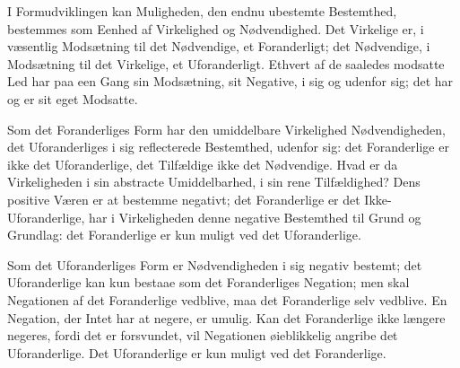 \documentclass[12pt]{book}
\begin{document}
I Formudviklingen kan Muligheden, den endnu ubestemte
Bestemthed, bestemmes som Eenhed af Virkelighed og Nødvendighed.
Det Virkelige er, i væsentlig Modsætning til det
Nødvendige, et Foranderligt; det Nødvendige, i Modsætning
til det Virkelige, et Uforanderligt. Ethvert af de saaledes
modsatte Led har paa een Gang sin Modsætning, sit Negative,
i sig og udenfor sig; det har og er sit eget Modsatte.

Som det Foranderliges Form har den umiddelbare Virkelighed
Nødvendigheden, det Uforanderliges i sig reflecterede
Bestemthed, udenfor sig: det Foranderlige er ikke det Uforanderlige,
det Tilfældige ikke det Nødvendige. Hvad er da
Virkeligheden i sin abstracte Umiddelbarhed, i sin rene
Tilfældighed? Dens positive Væren er at bestemme negativt;
det Foranderlige er det Ikke-Uforanderlige, har i Virkeligheden
denne negative Bestemthed til Grund og Grundlag: det
Foranderlige er kun muligt ved det Uforanderlige.

Som det Uforanderliges Form er Nødvendigheden i sig
negativ bestemt; det Uforanderlige kan kun bestaae som det Foranderliges
Negation; men skal Negationen af det Foranderlige
vedblive, maa det Foranderlige selv vedblive. En Negation,
der Intet har at negere, er umulig. Kan det Foranderlige
ikke længere negeres, fordi det er forsvundet, vil
Negationen øieblikkelig angribe det Uforanderlige. Det Uforanderlige
er kun muligt ved det Foranderlige.
\end{document}
